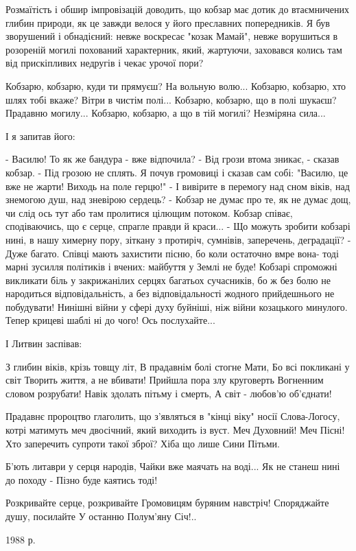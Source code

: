 Розмаїтість і обшир імпровізацій доводить, що кобзар має дотик до втаємничених
глибин природи, як це завжди велося у його преславних попередників. Я був
зворушений і обнадієний: невже воскресає "козак Мамай", невже ворушиться в
розореній могилі похований характерник, який, жартуючи, заховався колись там
від прискіпливих недругів і чекає урочої пори?

Кобзарю, кобзарю, куди ти прямуєш?
На вольную волю...
Кобзарю, кобзарю, хто шлях тобі вкаже?
Вітри в чистім полі...
Кобзарю, кобзарю, що в полі шукаєш?
Прадавню могилу...
Кобзарю, кобзарю, а що в тій могилі?
Незміряна сила...

І я запитав його:

- Василю! То як же бандура - вже відпочила?
- Від грози втома зникає, - сказав кобзар. - Під грозою не сплять. Я почув громовиці і сказав сам собі: "Василю, це вже не жарти! Виходь на поле герцю!"
- І вивірите в перемогу над сном віків, над знемогою душ, над зневірою сердець?
- Кобзар не думає про те, як не думає дощ, чи слід ось тут або там пролитися цілющим потоком. Кобзар співає, сподіваючись, що є серце, спрагле правди й краси...
- Що можуть зробити кобзарі нині, в нашу химерну пору, зіткану з протиріч, сумнівів, заперечень, деградації?
- Дуже багато. Співці мають захистити пісню, бо коли остаточно вмре вона- тоді марні зусилля політиків і вчених: майбуття у Землі не буде! Кобзарі спроможні викликати біль у закрижанілих серцях багатьох сучасників, бо ж без болю не народиться відповідальність, а без відповідальності жодного прийдешнього не побудувати! Нинішні війни у сфері духу буйніші, ніж війни козацького минулого. Тепер крицеві шаблі ні до чого! Ось послухайте...

І Литвин заспівав:

З глибин віків, крізь товщу літ,
В прадавнім болі стогне Мати,
Бо всі покликані у світ
Творить життя, а не вбивати!
Прийшла пора злу круговерть
Вогненним словом розрубати!
Навік здолать пітьму і смерть,
А світ - любов'ю об'єднати!

Прадавнє пророцтво глаголить, що з'являться в "кінці віку" носії Слова-Логосу,
котрі матимуть меч двосічний, який виходить із вуст. Меч Духовний! Меч Пісні!
Хто заперечить супроти такої зброї? Хіба що лише Сини Пітьми.

Б'ють литаври у серця народів,
Чайки вже маячать на воді...
Як не станеш нині до походу -
Пізно буде каятись тоді!

Розкривайте серце, розкривайте
Громовицям буряним навстріч!
Споряджайте душу, посилайте
У останню Полум'яну Січ!..

1988 р.


